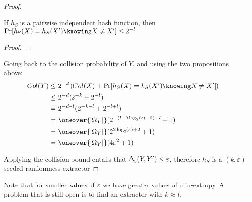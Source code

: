 \begin{proof}
    \begin{proposition}
        If $h_S$ is a pairwise independent hash function, then  $\Pr[h_S(X) = h_S(X') \knowing X \neq X'] \leq 2^{-l}$
    \end{proposition}
    
    \begin{proof}
    \end{proof}


    Going back to the collision probability of $Y$, and using the two propositions above:
    \begin{align*}
        Col(Y) \leq&\ 2^{-d} \left( Col(X) + \Pr[h_S(X) = h_S(X') \knowing X \neq X'] \right) & \\
               \leq&\ 2^{-d} (2^{-k} + 2^{-l}) & \\
                  =&\ 2^{-d - l} (2^{-k + l} + 2^{-l + l}) & \\
                  =&\ \oneover{|\Omega_Y|} (2^{-(l - 2 \log_2(\varepsilon) - 2) + l} + 1)  & \\
                  =&\ \oneover{|\Omega_Y|} (2^{2 \log_2(\varepsilon) + 2} + 1)  & \\
                  =&\ \oneover{|\Omega_Y|} (4\varepsilon^2 + 1) & \\
    \end{align*}

    Applying the collision bound entails that $\Delta_\textsc{s}(Y, Y') \leq \varepsilon$, therefore $h_S$ is a $(k, \varepsilon)$-seeded randomness extractor
\end{proof}

Note that for smaller values of $\varepsilon$ we have greater values of min-entropy. A problem that is still open is to find an extractor with $k \approx l$.

